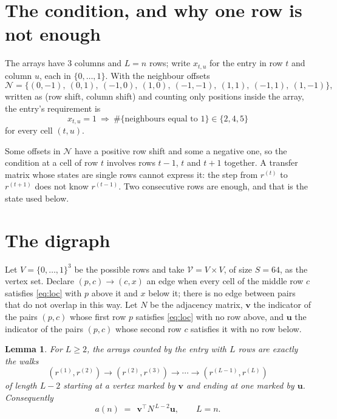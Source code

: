 \documentclass[11pt,a4paper]{article}
\theoremstyle{plain}
\newtheorem{lemma}[theorem]{Lemma}
\theoremstyle{definition}
\begin{document}
\section{The condition, and why one row is not enough}

The arrays have $3$ columns and $L=n$ rows; write $x_{t,u}$ for the entry in
row $t$ and column $u$, each in $\{0,\dots,1\}$. With the neighbour offsets
\[
\mathcal N=\{(0,-1),\ (0,1),\ (-1,0),\ (1,0),\ (-1,-1),\ (1,1),\ (-1,1),\ (1,-1)\},
\]
written as (row shift, column shift) and counting only positions inside the array, the
entry's requirement is
\begin{equation}\label{eq:loc}
x_{t,u}=1\ \Rightarrow\ \#\{\text{neighbours equal to }1\}\in\{2,4,5\}
\end{equation}
for every cell $(t,u)$.

Some offsets in $\mathcal N$ have a positive row shift and some a negative one, so the
condition at a cell of row $t$ involves rows $t-1$, $t$ and $t+1$ together. A transfer
matrix whose states are single rows cannot express it: the step from $r^{(t)}$ to
$r^{(t+1)}$ does not know $r^{(t-1)}$. Two consecutive rows are enough, and that is
the state used below.

\section{The digraph}

Let $V=\{0,\dots,1\}^{3}$ be the possible rows and take
$\mathcal V=V\times V$, of size $S=64$, as the vertex set. Declare $(p,c)\to(c,x)$ an edge
when every cell of the middle row $c$ satisfies \eqref{eq:loc} with $p$ above it and $x$
below it; there is no edge between pairs that do not overlap in this way. Let $N$ be the
adjacency matrix, $\mathbf{v}$ the indicator of the pairs $(p,c)$ whose first row $p$
satisfies \eqref{eq:loc} with no row above, and $\mathbf{u}$ the indicator of
the pairs $(p,c)$ whose second row $c$ satisfies it with no row below.

\begin{lemma}\label{lem:walk}
For $L\ge2$, the arrays counted by the entry with $L$ rows are exactly the walks
\[
(r^{(1)},r^{(2)})\to(r^{(2)},r^{(3)})\to\cdots\to(r^{(L-1)},r^{(L)})
\]
of length $L-2$ starting at a vertex marked by $\mathbf{v}$ and ending at one marked by
$\mathbf{u}$. Consequently
\[
a(n)\;=\;\,\mathbf{v}^{\!\top}N^{\,L-2}\mathbf{u},\qquad L=n .
\]
\end{lemma}
\end{document}
